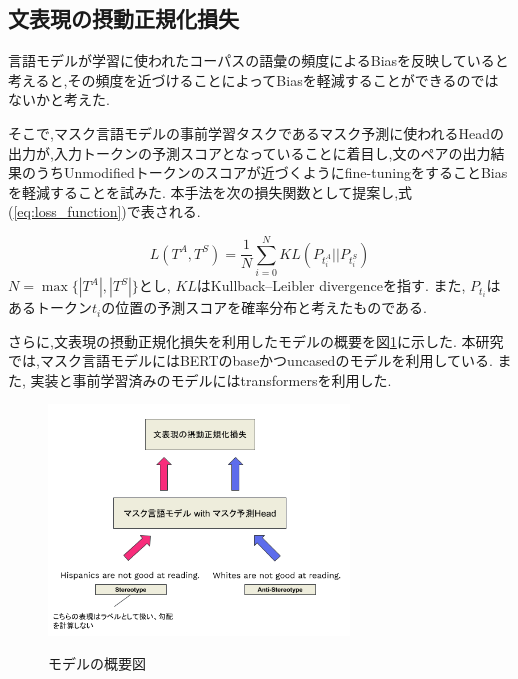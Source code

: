 \documentclass[
  platex, dvipdfmx %
]{nlp2021}
\begin{document}
\subsection{文表現の摂動正規化損失}
言語モデルが学習に使われたコーパスの語彙の頻度によるBiasを反映していると考えると,その頻度を近づけることによってBiasを軽減することができるのではないかと考えた.

そこで,マスク言語モデルの事前学習タスクであるマスク予測に使われるHeadの出力が,入力トークンの予測スコアとなっていることに着目し,文のペアの出力結果のうちUnmodifiedトークンのスコアが近づくようにfine-tuningをすることBiasを軽減することを試みた.
本手法を次の損失関数として提案し,式(\ref{eq:loss_function})で表される.

\begin{equation}
\label{eq:loss_function}
L(T^A, T^S) = \frac{1}{N}\sum_{i=0}^{N}{KL(P_{t^A_i} || P_{t^S_i})}
\end{equation}
$N = \max \{|T^A|, |T^S|\}$とし, $KL$はKullback–Leibler divergenceを指す.
また, $P_{t_i}$はあるトークン$t_i$の位置の予測スコアを確率分布と考えたものである.

さらに,文表現の摂動正規化損失を利用したモデルの概要を図\ref{fig:model}に示した.
本研究では,マスク言語モデルにはBERTのbaseかつuncasedのモデルを利用している.
また, 実装と事前学習済みのモデルにはtransformers\cite{wolf-etal-2020-transformers}を利用した.

\begin{figure}[h]
\centering
\caption{モデルの概要図}
\includegraphics[width=8cm]{Model_architecture}
\label{fig:model}
\end{figure}
\end{document}
